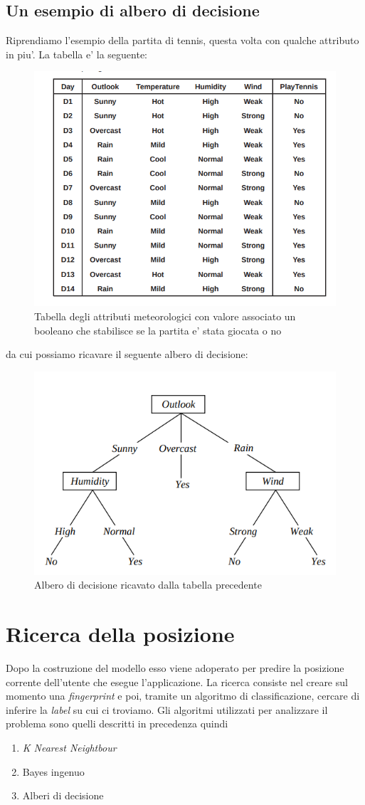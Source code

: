 \subsection{Un esempio di albero di decisione}
Riprendiamo l'esempio della partita di tennis, questa volta con qualche attributo in piu'. La tabella e' la seguente:
\begin{figure}[H]
	\centering
	\includegraphics[width=0.7\linewidth]{img/decision-_tree_table_tennis}
	\caption{Tabella degli attributi meteorologici con valore associato un booleano che stabilisce se la partita e' stata giocata o no}
	\label{fig:decision-treetabletennis}
\end{figure}
da cui possiamo ricavare il seguente albero di decisione:
\begin{figure}[H]
	\centering
	\includegraphics[width=0.7\linewidth]{img/decision_tree_tree_tennis}
	\caption{Albero di decisione ricavato dalla tabella precedente}
	\label{fig:decisiontreetreetennis}
\end{figure}

\section{Ricerca della posizione}
Dopo la costruzione del modello esso viene adoperato per predire la posizione corrente dell'utente che esegue l'applicazione. La ricerca consiste nel creare sul momento una \textit{fingerprint} e poi, tramite un algoritmo di classificazione, cercare di inferire la \textit{label}  su cui ci troviamo. Gli algoritmi utilizzati per analizzare il problema sono quelli descritti in precedenza quindi
\begin{enumerate}
	\item \textit{K Nearest Neightbour}
	\item Bayes ingenuo
	\item  Alberi di decisione
\end{enumerate}
\newpage
